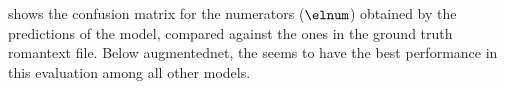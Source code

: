 
 shows the confusion
matrix for the numerators ($\elnum$) obtained by the
predictions of the \textcite{mcleod2021modular} model,
compared against the ones in the ground truth
\gls{romantext} file. Below \gls{augmentednet}, the
\textcite{mcleod2021modular} seems to have the best
performance in this evaluation among all other models.

